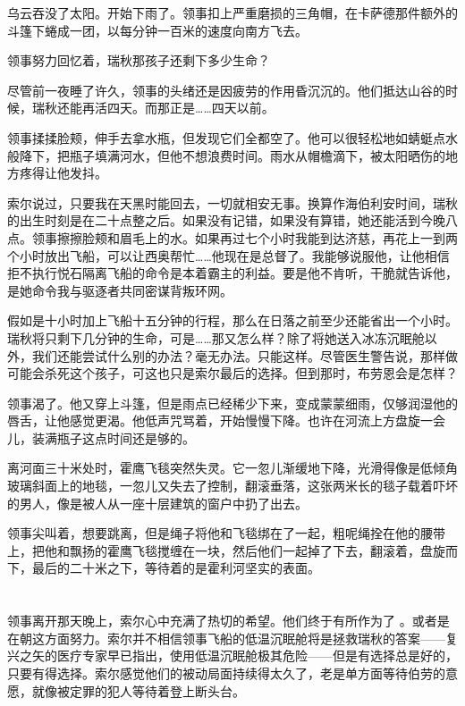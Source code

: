 \documentclass[AutoFakeBold=true]{book}
\begin{document}
乌云吞没了太阳。开始下雨了。领事扣上严重磨损的三角帽，在卡萨德那件额外的斗篷下蜷成一团，以每分钟一百米的速度向南方飞去。

\vspace*{1em}

领事努力回忆着，{\kaishu 瑞秋那孩子还剩下多少生命？}

尽管前一夜睡了许久，领事的头绪还是因疲劳的作用昏沉沉的。{\kaishu 他们抵达山谷的时候，瑞秋还能再活四天。而那正是……四天以前。}

领事揉揉脸颊，伸手去拿水瓶，但发现它们全都空了。他可以很轻松地如蜻蜓点水般降下，把瓶子填满河水，但他不想浪费时间。雨水从帽檐滴下，被太阳晒伤的地方疼得让他发抖。

{\kaishu 索尔说过，只要我在天黑时能回去，一切就相安无事。换算作海伯利安时间，瑞秋的出生时刻是在二十点整之后。如果没有记错，如果没有算错，她还能活到今晚八点。}领事擦擦脸颊和眉毛上的水。{\kaishu 如果再过七个小时我能到达济慈，再花上一到两个小时放出飞船，可以让西奥帮忙……他现在是总督了。我能够说服他，让他相信拒不执行悦石隔离飞船的命令是本着霸主的利益。要是他不肯听，干脆就告诉他，是她命令我与驱逐者共同密谋背叛环网。}

{\kaishu 假如是十小时加上飞船十五分钟的行程，那么在日落之前至少还能省出一个小时。瑞秋将只剩下几分钟的生命，可是……那又怎么样？除了将她送入冰冻沉眠舱以外，我们还能尝试什么别的办法？毫无办法。只能这样。尽管医生警告说，那样做可能会杀死这个孩子，可这也只是索尔最后的选择。但到那时，布劳恩会是怎样？}

领事渴了。他又穿上斗篷，但是雨点已经稀少下来，变成蒙蒙细雨，仅够润湿他的唇舌，让他感觉更渴。他低声咒骂着，开始慢慢下降。也许在河流上方盘旋一会儿，装满瓶子这点时间还是够的。

离河面三十米处时，霍鹰飞毯突然失灵。它一忽儿渐缓地下降，光滑得像是低倾角玻璃斜面上的地毯，一忽儿又失去了控制，翻滚垂落，这张两米长的毯子载着吓坏的男人，像是被人从一座十层建筑的窗户中扔了出去。

领事尖叫着，想要跳离，但是绳子将他和飞毯绑在了一起，粗呢绳拴在他的腰带上，把他和飘扬的霍鹰飞毯搅缠在一块，然后他们一起掉了下去，翻滚着，盘旋而下，最后的二十米之下，等待着的是霍利河坚实的表面。

\chapter{}

领事离开那天晚上，索尔心中充满了热切的希望。他们终于{\kaishu 有所}作为了 。或者是在朝这方面努力。索尔并不相信领事飞船的低温沉眠舱将是拯救瑞秋的答案——复兴之矢的医疗专家早已指出，使用低温沉眠舱极其危险——但是有选择总是好的，只要{\kaishu 有得}选择。索尔感觉他们的被动局面持续得太久了，老是单方面等待伯劳的意愿，就像被定罪的犯人等待着登上断头台。
\end{document}
